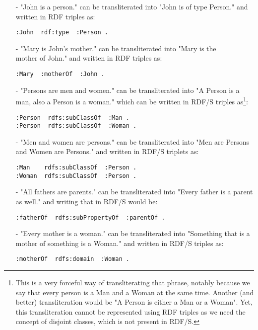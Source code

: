 \documentclass[a4paper,12pt]{article}
\begin{document}
\begin{itemize}
\item[-]"John is a person." can be transliterated into "John is of type
Person." and written in RDF triples as:
\begin{Verbatim}[samepage=true]
:John  rdf:type  :Person .
\end{Verbatim}

\item[-]"Mary is John’s mother." can be transliterated into "Mary is the\\
mother of John." and written in RDF triples as:
\begin{Verbatim}[samepage=true]
:Mary  :motherOf  :John .
\end{Verbatim}

\item[-]"Persons are men and women." can be transliterated into "A Person is a
man, also a Person is a woman." which can be written in RDF/S triples
as\footnote{This is a very forceful way of transliterating that phrase, notably
because we say that every person is a Man and a Woman at the same time.
Another (and better) transliteration would be "A Person is either a Man or a
Woman".  Yet, this transliteration cannot be represented using RDF triples as
we need the concept of disjoint classes, which is not present in RDF/S.}:
\begin{Verbatim}[samepage=true]
:Person  rdfs:subClassOf  :Man .
:Person  rdfs:subClassOf  :Woman .
\end{Verbatim}

\item[-]"Men and women are persons." can be transliterated into "Men are
Persons and Women are Persons." and written in RDF/S triplets as:
\begin{Verbatim}[samepage=true]
:Man    rdfs:subClassOf  :Person .
:Woman  rdfs:subClassOf  :Person .
\end{Verbatim}

\item[-]"All fathers are parents." can be transliterated into "Every father is
a parent as well." and writing that in RDF/S would be:
\begin{Verbatim}[samepage=true]
:fatherOf  rdfs:subPropertyOf  :parentOf .
\end{Verbatim}

\item[-]"Every mother is a woman." can be transliterated into "Something that
is a mother of something is a Woman." and written in RDF/S triples as:
\begin{Verbatim}[samepage=true]
:motherOf  rdfs:domain  :Woman .
\end{Verbatim}


\end{itemize}
\end{document}
